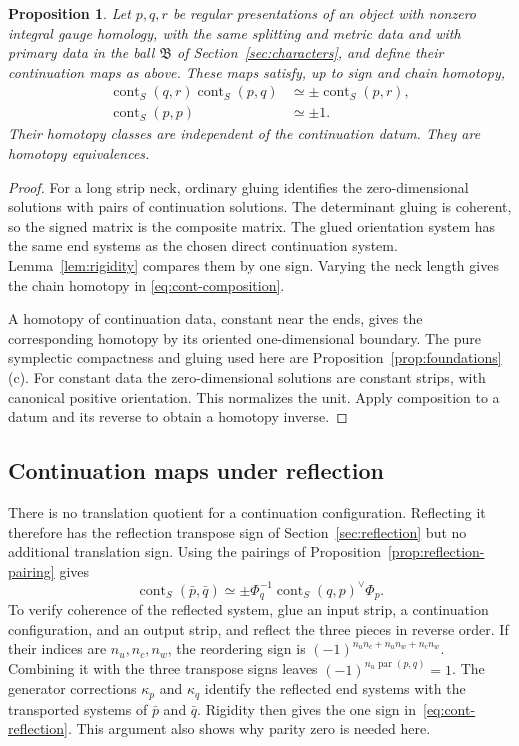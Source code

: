 \documentclass[11pt]{amsart}
\newtheorem{proposition}[theorem]{Proposition}
\theoremstyle{definition}
\theoremstyle{remark}
\theoremstyle{plain}
\numberwithin{equation}{section}
\newcommand{\cont}{\operatorname{cont}}
\begin{document}
\begin{proposition}\label{prop:continuation}
Let $p,q,r$ be regular presentations of an object
with nonzero integral gauge homology, with the
same splitting and metric data and with primary
data in the ball $\mathfrak B$ of
Section~\ref{sec:characters}, and define their
continuation maps as above. These maps satisfy,
up to sign and chain homotopy,
\begin{align}
 \cont_S(q,r)\cont_S(p,q)&\simeq
                 \pm\cont_S(p,r),\label{eq:cont-composition}\\
 \cont_S(p,p)&\simeq\pm1.\label{eq:cont-unit}
\end{align}
Their homotopy classes are independent of
the continuation datum. They are homotopy
equivalences.
\end{proposition}
\begin{proof}
For a long strip neck, ordinary gluing
identifies the zero-dimensional solutions
with pairs of continuation solutions.
The determinant gluing is coherent, so
the signed matrix is the composite matrix.
The glued orientation system has the same
end systems as the chosen direct
continuation system. Lemma~\ref{lem:rigidity}
compares them by one sign. Varying the
neck length gives the chain homotopy in
\eqref{eq:cont-composition}.

A homotopy of continuation data, constant
near the ends, gives the corresponding
homotopy by its oriented one-dimensional
boundary. The pure symplectic compactness
and gluing used here are
Proposition~\ref{prop:foundations}(c). For
constant data the zero-dimensional
solutions are constant strips, with
canonical positive orientation. This
normalizes the unit. Apply composition
to a datum and its reverse to obtain a
homotopy inverse.
\end{proof}

\subsection{Continuation maps under reflection}
There is no translation quotient for a
continuation configuration. Reflecting it
therefore has the reflection transpose sign of Section~\ref{sec:reflection}
but no additional translation sign.
Using the pairings of
Proposition~\ref{prop:reflection-pairing}
gives
\begin{equation}\label{eq:cont-reflection}
 \cont_S(\bar p,\bar q)\simeq
 \pm\Phi_q^{-1}\cont_S(q,p)^\vee\Phi_p.
\end{equation}
To verify coherence of the reflected
system, glue an input strip, a
continuation configuration, and an
output strip, and reflect the three
pieces in reverse order. If their
indices are $n_u,n_c,n_w$, the reordering
sign is
$(-1)^{n_un_c+n_un_w+n_cn_w}$.
Combining it with the three transpose
signs leaves $(-1)^{n_u\operatorname{par}(p,q)}=1$.
The generator corrections $\kappa_p$
and $\kappa_q$ identify the reflected
end systems with the transported
systems of $\bar p$ and $\bar q$. Rigidity then gives the one
sign in~\eqref{eq:cont-reflection}.
This argument also shows why parity
zero is needed here.
\end{document}
